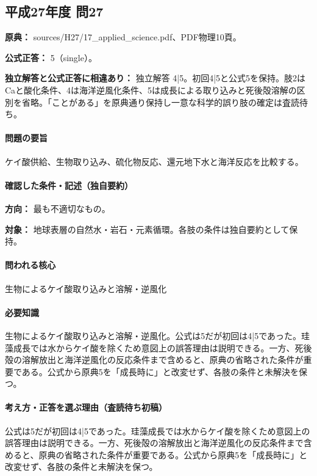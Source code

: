 \subsection{平成27年度 問27}
\label{q:h27-reg-applied-27}

\noindent\textbf{原典：} sources/H27/17\_applied\_science.pdf、PDF物理10頁。

\textbf{公式正答：} 5（single）。

\par\textbf{独立解答と公式正答に相違あり：} 独立解答 4|5。初回4|5と公式5を保持。肢2はCaと酸化条件、4は海洋逆風化条件、5は成長による取り込みと死後殻溶解の区別を省略。「ことがある」を原典通り保持し一意な科学的誤り肢の確定は査読待ち。

\paragraph{問題の要旨} ケイ酸供給、生物取り込み、硫化物反応、還元地下水と海洋反応を比較する。

\paragraph{確認した条件・記述（独自要約）}\mbox{}\par

\noindent\textbf{方向：} 最も不適切なもの。\par

\noindent\textbf{対象：} 地球表層の自然水・岩石・元素循環。各肢の条件は独自要約として保持。\par

\paragraph{問われる核心} 生物によるケイ酸取り込みと溶解・逆風化

\paragraph{必要知識} 生物によるケイ酸取り込みと溶解・逆風化。公式は5だが初回は4|5であった。珪藻成長では水からケイ酸を除くため意図上の誤答理由は説明できる。一方、死後殻の溶解放出と海洋逆風化の反応条件まで含めると、原典の省略された条件が重要である。公式から原典5を「成長時に」と改変せず、各肢の条件と未解決を保つ。

\paragraph{考え方・正答を選ぶ理由（査読待ち初稿）} 公式は5だが初回は4|5であった。珪藻成長では水からケイ酸を除くため意図上の誤答理由は説明できる。一方、死後殻の溶解放出と海洋逆風化の反応条件まで含めると、原典の省略された条件が重要である。公式から原典5を「成長時に」と改変せず、各肢の条件と未解決を保つ。

